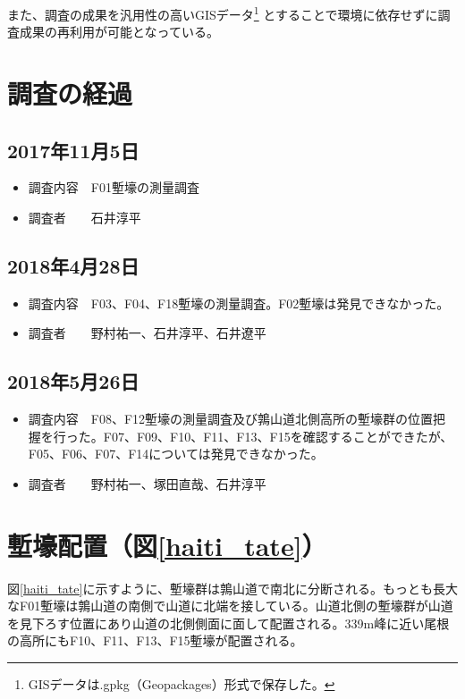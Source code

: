 \documentclass[14Q]{jsarticle}
\begin{document}
また、調査の成果を汎用性の高いGISデータ\footnote{
GISデータは.gpkg（Geopackages）形式で保存した。
}
とすることで環境に依存せずに調査成果の再利用が可能となっている。

\section{調査の経過}
\subsection{2017年11月5日}
\begin{itemize}
\item 調査内容　F01塹壕の測量調査
\item 調査者　　石井淳平
\end{itemize}

\subsection{2018年4月28日}
\begin{itemize}
\item 調査内容　F03、F04、F18塹壕の測量調査。F02塹壕は発見できなかった。
\item 調査者　　野村祐一、石井淳平、石井遼平
\end{itemize}

\subsection{2018年5月26日}
\begin{itemize}
\item 調査内容　F08、F12塹壕の測量調査及び鶉山道北側高所の塹壕群の位置把握を行った。F07、F09、F10、F11、F13、F15を確認することができたが、F05、F06、F07、F14については発見できなかった。
\item 調査者　　野村祐一、塚田直哉、石井淳平
\end{itemize}

\section{塹壕配置（図\ref{haiti_tate}）}
図\ref{haiti_tate}に示すように、塹壕群は鶉山道で南北に分断される。もっとも長大なF01塹壕は鶉山道の南側で山道に北端を接している。山道北側の塹壕群が山道を見下ろす位置にあり山道の北側側面に面して配置される。339m峰に近い尾根の高所にもF10、F11、F13、F15塹壕が配置される。
\end{document}
